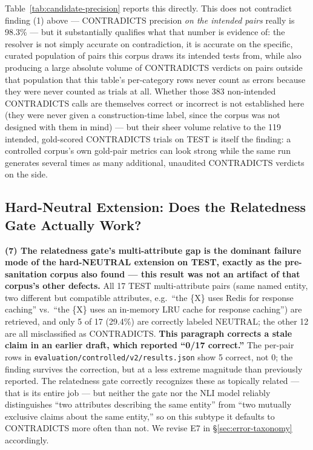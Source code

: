Table~\ref{tab:candidate-precision} reports this directly. This
does not contradict finding (1) above --- CONTRADICTS precision
\emph{on the intended pairs} really is 98.3\% --- but it substantially
qualifies what that number is evidence of: the resolver is not simply
accurate on contradiction, it is accurate on the specific, curated
population of pairs this corpus draws its intended tests from, while
also producing a large absolute volume of CONTRADICTS verdicts on pairs
outside that population that this table's per-category rows never
count as errors because they were never counted as trials at all.
Whether those 383 non-intended CONTRADICTS calls are themselves correct
or incorrect is not established here (they were never given a
construction-time label, since the corpus was not designed with them in
mind) --- but their sheer volume relative to the 119 intended,
gold-scored CONTRADICTS trials on TEST is itself the finding: a
controlled corpus's own gold-pair metrics can look strong while the same
run generates several times as many additional, unaudited CONTRADICTS
verdicts on the side.

\subsection{Hard-Neutral Extension: Does the Relatedness Gate Actually
Work?}
\label{sec:hard-neutral}



\textbf{(7) The relatedness gate's multi-attribute gap is the dominant
failure mode of the hard-NEUTRAL extension on TEST, exactly as the
pre-sanitation corpus also found --- this result was not an artifact of
that corpus's other defects.} All 17 TEST multi-attribute pairs (same
named entity, two different but compatible attributes, e.g.\ ``the
\{X\} uses Redis for response caching'' vs.\ ``the \{X\} uses an
in-memory LRU cache for response caching'') are retrieved, and only 5 of
17 (29.4\%) are correctly labeled NEUTRAL; the other 12 are all
misclassified as CONTRADICTS. \textbf{This paragraph corrects a stale
claim in an earlier draft, which reported ``0/17 correct.''} The
per-pair rows in \texttt{evaluation/controlled/v2/results.json} show 5
correct, not 0; the finding survives the correction, but at a less
extreme magnitude than previously reported. The relatedness gate
correctly recognizes these as topically related --- that is its entire
job --- but neither the gate nor the NLI model reliably distinguishes
``two attributes describing the same entity'' from ``two mutually
exclusive claims about the same entity,'' so on this subtype it defaults
to CONTRADICTS more often than not. We revise E7 in
\S\ref{sec:error-taxonomy} accordingly.


